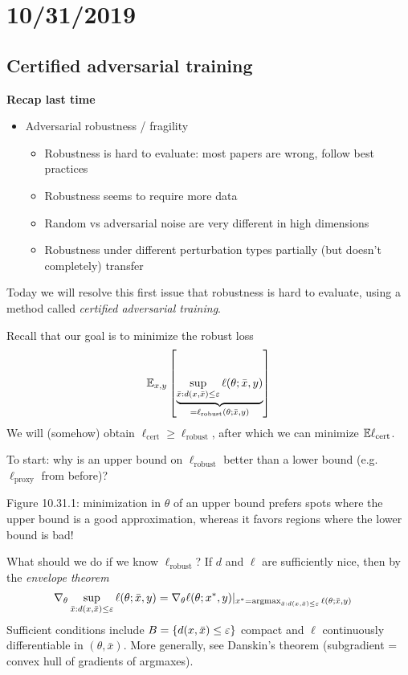 \section{10/31/2019}

\subsection{Certified adversarial training}

\textbf{Recap last time}
\begin{itemize}
  \item Adversarial robustness / fragility
    \begin{itemize}
      \item Robustness is hard to evaluate: most papers are wrong, follow best practices
      \item Robustness seems to require more data
      \item Random vs adversarial noise are very different in high dimensions
      \item Robustness under different perturbation types partially
	(but doesn't completely) transfer
    \end{itemize}
\end{itemize}

Today we will resolve this first issue that robustness is hard to evaluate,
using a method called \emph{certified adversarial training}.

Recall that our goal is to minimize the robust loss
\begin{align}
  \mathbb{E}_{x,y}\left[
    \underbrace{\sup_{\bar{x} : d(x,\bar{x}) \leq \varepsilon} \ell(\theta; \bar{x}, y)}_{=\ell_{\text{robust}}(\theta; \bar{x}, y)}
  \right]
\end{align}
We will (somehow) obtain $\ell_{\text{cert}} \geq \ell_{\text{robust}}$, after
which we can minimize $\mathbb{E} \ell_{\text{cert}}$.

To start: why is an upper bound on $\ell_{\text{robust}}$ better
than a lower bound (e.g. $\ell_{\text{proxy}}$ from before)?

Figure 10.31.1: minimization in $\theta$ of an upper bound prefers spots where
the upper bound is a good approximation, whereas it favors regions
where the lower bound is bad!

What should we do if we know $\ell_{\text{robust}}$?
If $d$ and $\ell$ are sufficiently nice, then by
the \emph{envelope theorem}
\begin{align}
  \nabla_\theta \sup_{\bar{x} : d(x,\bar{x}) \leq \varepsilon} \ell(\theta; \bar{x}, y)
  &=
  \nabla_\theta \ell(\theta; x^*, y) \vert_{x^*=\operatorname{argmax}_{\bar{x} : d(x,\bar{x}) \leq \varepsilon} \ell(\theta; \bar{x}, y)}
\end{align}
Sufficient conditions include $B = \{d(x,\bar{x}) \leq \varepsilon\}$ compact and $\ell$ continuously
differentiable in $(\theta, \bar{x})$. More generally, see Danskin's theorem
(subgradient = convex hull of gradients of argmaxes).

